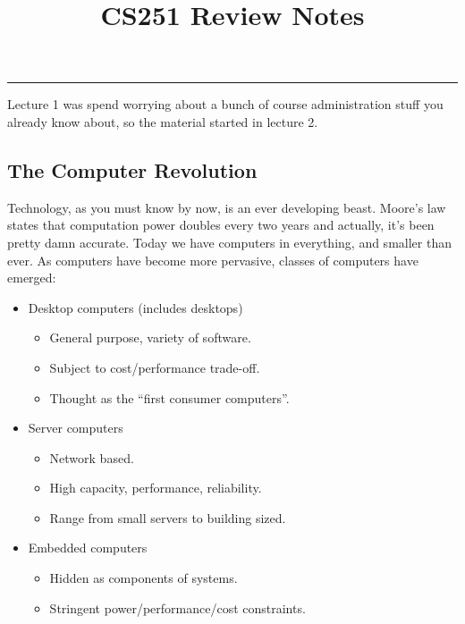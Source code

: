 \documentclass[12pt, twoside, exarticle]{article}
\title{\textbf{CS251 Review Notes}}
\begin{document}
\makeatletter
\hfil\parbox[t]{0.7\textwidth}{\centering\LARGE\bfseries\@title}\par
\kern0.5cm \hrule\kern0.5cm
\makeatother

\renewcommand{\contentsname}{Table of Contents}
\tableofcontents
\clearpage

\setlength{\oddsidemargin}{1.6cm}
\setlength{\evensidemargin}{\oddsidemargin}
\setlength{\marginparwidth}{2.6cm}
\setlength{\marginparsep}{0.25cm}


Lecture 1 was spend worrying about a bunch of course administration stuff you already know about, so the material started in lecture 2. \\

\subsection{The Computer Revolution}

Technology, as you must know by now, is an ever developing beast.  Moore's law states that computation power doubles every two years and actually, it's been pretty damn accurate.  Today we have computers in everything, and smaller than ever.  As computers have become more pervasive, classes of computers have emerged:
\begin{itemize}
\item Desktop computers (includes desktops)
	\begin{itemize}
	\item General purpose, variety of software.
	\item Subject to cost/performance trade-off.
	\item Thought as the ``first consumer computers''.
	\end{itemize}
\item Server computers
	\begin{itemize}
	\item Network based.
	\item High capacity, performance, reliability.
	\item Range from small servers to building sized.
	\end{itemize}
\item Embedded computers
	\begin{itemize}
	\item Hidden as components of systems.
	\item Stringent power/performance/cost constraints.
	\end{itemize}
\end{itemize}
\end{document}
